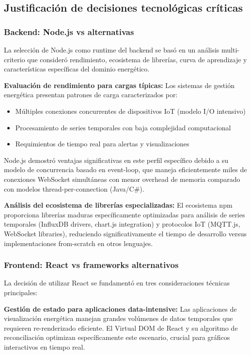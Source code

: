 \subsection{Justificación de decisiones tecnológicas críticas}

\subsubsection{Backend: Node.js vs alternativas}

La selección de Node.js como runtime del backend se basó en un análisis multi-criterio que consideró rendimiento, ecosistema de librerías, curva de aprendizaje y características específicas del dominio energético.

\textbf{Evaluación de rendimiento para cargas típicas:}
Los sistemas de gestión energética presentan patrones de carga caracterizados por: 
\begin{itemize}
    \item Múltiples conexiones concurrentes de dispositivos IoT (modelo I/O intensivo)
    \item Procesamiento de series temporales con baja complejidad computacional
    \item Requimientos de tiempo real para alertas y visualizaciones
\end{itemize}

Node.js demostró ventajas significativas en este perfil específico debido a su modelo de concurrencia basado en event-loop, que maneja eficientemente miles de conexiones WebSocket simultáneas con menor overhead de memoria comparado con modelos thread-per-connection (Java/C\#).

\textbf{Análisis del ecosistema de librerías especializadas:}
El ecosistema npm proporciona librerías maduras específicamente optimizadas para análisis de series temporales (InfluxDB drivers, chart.js integration) y protocolos IoT (MQTT.js, WebSocket libraries), reduciendo significativamente el tiempo de desarrollo versus implementaciones from-scratch en otros lenguajes.

\subsubsection{Frontend: React vs frameworks alternativos}

La decisión de utilizar React se fundamentó en tres consideraciones técnicas principales:

\textbf{Gestión de estado para aplicaciones data-intensive:}
Las aplicaciones de visualización energética manejan grandes volúmenes de datos temporales que requieren re-renderizado eficiente. El Virtual DOM de React y su algoritmo de reconciliación optimizan específicamente este escenario, crucial para gráficos interactivos en tiempo real.

